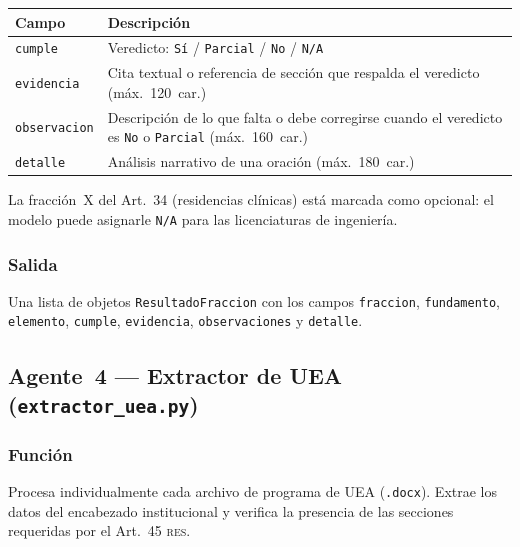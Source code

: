 \documentclass[11pt,a4paper]{article}
\newcommand{\RES}{\textsc{res}}
\begin{document}
\begin{center}
\begin{tabular}{lp{9cm}}
\toprule
\textbf{Campo} & \textbf{Descripción} \\
\midrule
\texttt{cumple}      & Veredicto: \texttt{Sí} / \texttt{Parcial} / \texttt{No} / \texttt{N/A} \\
\texttt{evidencia}   & Cita textual o referencia de sección que respalda el veredicto
                       (máx.\ 120~car.) \\
\texttt{observacion} & Descripción de lo que falta o debe corregirse cuando el
                       veredicto es \texttt{No} o \texttt{Parcial} (máx.\ 160~car.) \\
\texttt{detalle}     & Análisis narrativo de una oración (máx.\ 180~car.) \\
\bottomrule
\end{tabular}
\end{center}

\begin{notabox}
La fracción~X del Art.\ 34 (residencias clínicas) está marcada como opcional:
el modelo puede asignarle \texttt{N/A} para las licenciaturas de ingeniería.
\end{notabox}

\subsubsection{Salida}

Una lista de objetos \texttt{ResultadoFraccion} con los campos \texttt{fraccion},
\texttt{fundamento}, \texttt{elemento}, \texttt{cumple}, \texttt{evidencia},
\texttt{observaciones} y \texttt{detalle}.

\subsection{Agente~4 --- Extractor de UEA (\texttt{extractor\_uea.py})}

\subsubsection{Función}

Procesa individualmente cada archivo de programa de UEA (\texttt{.docx}).
Extrae los datos del encabezado institucional y verifica la presencia de las secciones
requeridas por el Art.\ 45 \RES{}.
\end{document}
